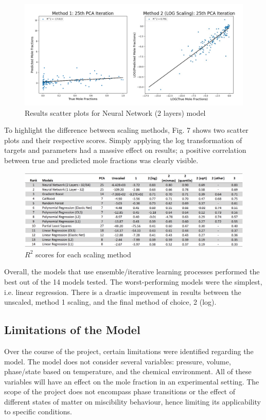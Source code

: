 \documentclass[11pt, titlepage]{article}
\begin{document}
\begin{figure}[ht]
\centering
\includegraphics[width=16cm]{media/Scatters.png}
\caption{Results scatter plots for Neural Network (2 layers) model}
\end{figure}

\newpage

To highlight the difference between scaling methods, Fig. 7 shows two scatter plots and their respective scores. Simply applying the log transformation of targets and parameters had a massive effect on results; a positive correlation between true and predicted mole fractions was clearly visible.\\

\begin{figure}[ht]
\centering
\includegraphics[width=16cm]{./media/r2results.png}
\caption{$R^{2}$ scores for each scaling method}
\end{figure}

Overall, the models that use ensemble/iterative learning processes performed the best out of the 14 models tested. The worst-performing models were the simplest, i.e. linear regression. There is a drastic improvement in results between the unscaled, method 1 scaling, and the final method of choice, 2 (log).

\subsection{Limitations of the Model}
Over the course of the project, certain limitations were identified regarding the model. The model does not consider several variables: pressure, volume, phase/state based on temperature, and the chemical environment. All of these variables will have an effect on the mole fraction in an experimental setting. The scope of the project does not encompass phase transitions or the effect of different states of matter on miscibility behaviour, hence limiting its applicability to specific conditions.\\
\end{document}
